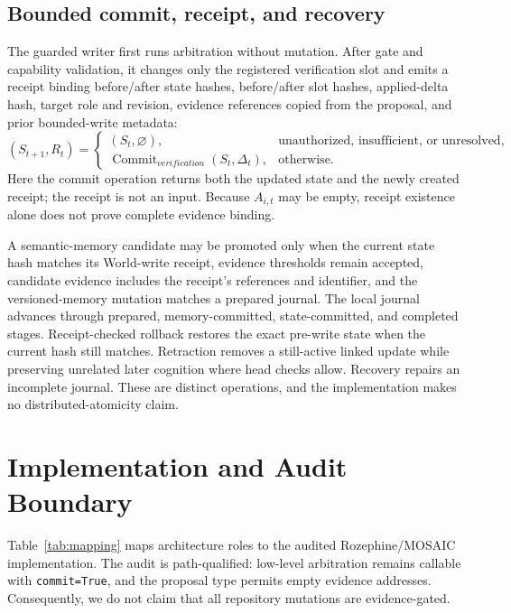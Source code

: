 \documentclass[10pt]{article}
\newcommand{\code}[1]{\texttt{#1}}
\begin{document}
\subsection{Bounded commit, receipt, and recovery}

The guarded writer first runs arbitration without mutation. After gate and capability validation, it changes only the registered verification slot and emits a receipt binding before/after state hashes, before/after slot hashes, applied-delta hash, target role and revision, evidence references copied from the proposal, and prior bounded-write metadata:
\begin{equation}
(S_{t+1},R_t)=\begin{cases}
(S_t,\varnothing),&\text{unauthorized, insufficient, or unresolved},\\
\operatorname{Commit}_{verification}(S_t,\Delta_t),&\text{otherwise.}
\end{cases}
\end{equation}
Here the commit operation returns both the updated state and the newly created receipt; the receipt is not an input. Because $A_{i,t}$ may be empty, receipt existence alone does not prove complete evidence binding.

A semantic-memory candidate may be promoted only when the current state hash matches its World-write receipt, evidence thresholds remain accepted, candidate evidence includes the receipt's references and identifier, and the versioned-memory mutation matches a prepared journal. The local journal advances through prepared, memory-committed, state-committed, and completed stages. Receipt-checked rollback restores the exact pre-write state when the current hash still matches. Retraction removes a still-active linked update while preserving unrelated later cognition where head checks allow. Recovery repairs an incomplete journal. These are distinct operations, and the implementation makes no distributed-atomicity claim.

\section{Implementation and Audit Boundary}

Table~\ref{tab:mapping} maps architecture roles to the audited Rozephine/MOSAIC implementation. The audit is path-qualified: low-level arbitration remains callable with \code{commit=True}, and the proposal type permits empty evidence addresses. Consequently, we do not claim that all repository mutations are evidence-gated.
\end{document}
